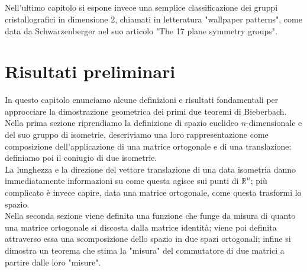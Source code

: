 \documentclass[a4paper,11pt,openright,twoside	]{book}
\begin{document}
\paragraph{}
Nell'ultimo capitolo si espone invece una semplice classificazione dei gruppi cristallografici in dimensione 2, chiamati in letteratura "wallpaper patterns", come data da Schwarzenberger nel suo articolo "The 17 plane symmetry groups". 
\chapter{Risultati preliminari}
In questo capitolo enunciamo alcune definizioni e risultati fondamentali per approcciare la dimostrazione geometrica dei primi due teoremi di Bieberbach.  \\
Nella prima sezione riprendiamo la definizione di spazio euclideo $n$-dimensionale e del suo gruppo di isometrie, descriviamo una loro rappresentazione come composizione dell'applicazione di una matrice ortogonale e di una translazione; definiamo poi il coniugio di due isometrie. \\
La lunghezza e la direzione del vettore translazione di una data isometria danno immediatamente informazioni su come questa agisce sui punti di $\mathbb{R}^n$; più complicato è invece capire, data una matrice ortogonale, come questa trasformi lo spazio. \\
Nella seconda sezione viene definita una funzione che funge da misura di quanto una matrice ortogonale si discosta dalla matrice identità; viene poi definita attraverso essa una scomposizione dello spazio in due spazi ortogonali; infine si dimostra un teorema che stima la "misura" del commutatore di due matrici a partire dalle loro "misure".  
\end{document}
